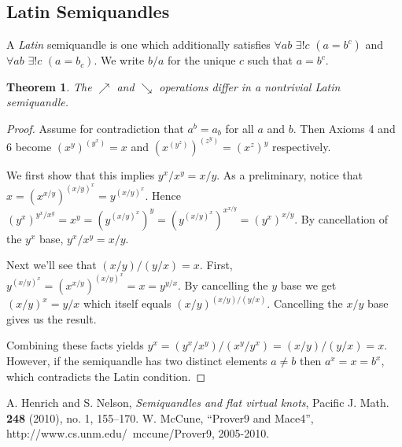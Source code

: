 \documentclass{amsart}
\newtheorem{thm}{Theorem}[section]
\theoremstyle{definition}
\numberwithin{equation}{section}
\begin{document}
\subsection{Latin Semiquandles}

A \emph{Latin} semiquandle is one which additionally satisfies
$\forall{ab}$ $\exists!{c}$ $(a=b^c)$ and $\forall{ab}$ $\exists!{c}$
$(a=b_c)$. We write $b/a$ for the unique $c$ such that $a = b^{c}$.

\begin{thm}
The $\nearrow$ and $\searrow$ operations differ in a nontrivial
Latin semiquandle.
\end{thm}
\begin{proof}
Assume for contradiction that $a^{b} = a_b$ for all $a$ and $b$.
Then Axioms 4 and 6 become $(x^y)^{(y^x)} = x$ and $(x^{(y^z)})^{(z^y)}
= (x^z)^y$ respectively.

We first show that this implies $y^{x}/x^{y} = x/y$. As a preliminary,
notice that $x = (x^{x/y})^{(x/y)^{x}} = y^{(x/y)^{x}}$. Hence
$(y^{x})^{y^{x}/x^{y}} = x^{y} = (y^{(x/y)^{x}})^{y} =
(y^{(x/y)^{x}})^{x^{x/y}} = (y^{x})^{x/y}$. By cancellation of the
$y^{x}$ base, $y^{x} / x^{y} = x/y$.

Next we'll see that $(x/y)/(y/x) = x$. First, $y^{{(x/y)}^{x}} =
(x^{x/y})^{{(x/y)}^{x}} = x = y^{y/x}$. By cancelling the $y$ base
we get $(x/y)^{x} = y/x$ which itself equals $(x/y)^{(x/y)/(y/x)}$.
Cancelling the $x/y$ base gives us the result.

Combining these facts yields $y^{x} = (y^{x}/x^{y}) / (x^{y}/y^{x})
= (x/y) / (y/x) = x$. However, if the semiquandle has two distinct
elements $a \neq b$ then $a^{x} = x = b^{x}$, which contradicts the
Latin condition.
\end{proof}

\begin{thebibliography}{9}

      A. Henrich and S. Nelson, \emph{Semiquandles and flat virtual
      knots}, Pacific J. Math. \textbf{248} (2010), no. 1, 155--170.
      W. McCune, ``Prover9 and Mace4'', http://www.cs.unm.edu/~mccune/Prover9, 2005-2010.

\end{thebibliography}
\end{document}
